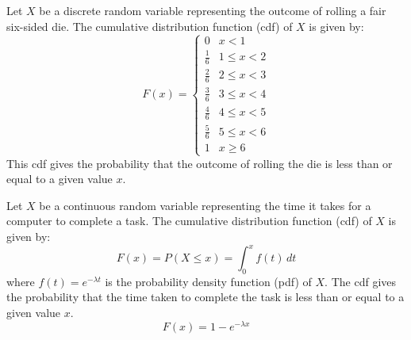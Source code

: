 \documentclass[openany]{book}
\begin{document}
\begin{example}
    Let $X$ be a discrete random variable representing the outcome of rolling a fair six-sided die. The cumulative distribution function (cdf) of $X$ is given by:
    \[
    F(x) = 
    \begin{cases} 
    0 & x < 1 \\
    \frac{1}{6} & 1 \leq x < 2 \\
    \frac{2}{6} & 2 \leq x < 3 \\
    \frac{3}{6} & 3 \leq x < 4 \\
    \frac{4}{6} & 4 \leq x < 5 \\
    \frac{5}{6} & 5 \leq x < 6 \\
    1 & x \geq 6 
    \end{cases}
    \]
    This cdf gives the probability that the outcome of rolling the die is less than or equal to a given value $x$.
\end{example}
\begin{example}
    Let $X$ be a continuous random variable representing the time it takes for a computer to complete a task. The cumulative distribution function (cdf) of $X$ is given by:
    $$F(x) = P(X \leq x) = \int_{0}^{x} f(t) \, dt$$
    where $f(t) = e^{-\lambda t}$ is the probability density function (pdf) of $X$. The cdf gives the probability that the time taken to complete the task is less than or equal to a given value $x$.
    $$F(x) = 1 - e^{-\lambda x}$$ 
\end{example}
\end{document}
